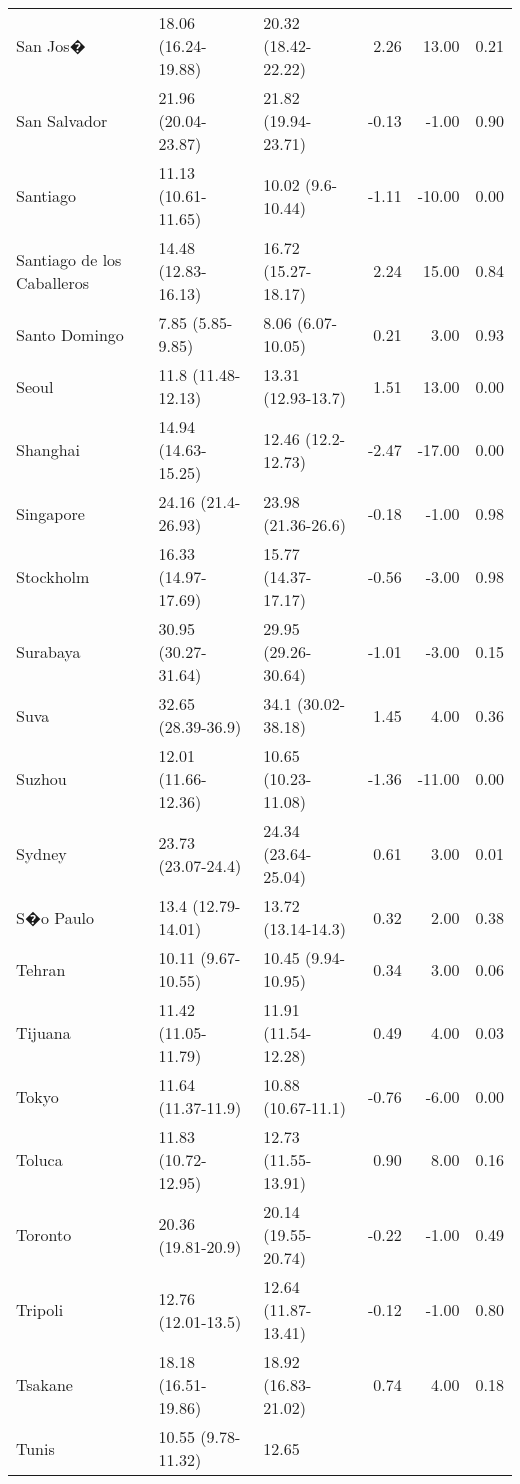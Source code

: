 \begin{longtable}{lllrrr}
  San Jos� & 18.06
 (16.24-19.88) & 20.32
 (18.42-22.22) & 2.26 & 13.00 & 0.21 \\ 
  San Salvador & 21.96
 (20.04-23.87) & 21.82
 (19.94-23.71) & -0.13 & -1.00 & 0.90 \\ 
  Santiago & 11.13
 (10.61-11.65) & 10.02
 (9.6-10.44) & -1.11 & -10.00 & 0.00 \\ 
  Santiago de los Caballeros & 14.48
 (12.83-16.13) & 16.72
 (15.27-18.17) & 2.24 & 15.00 & 0.84 \\ 
  Santo Domingo & 7.85
 (5.85-9.85) & 8.06
 (6.07-10.05) & 0.21 & 3.00 & 0.93 \\ 
  Seoul & 11.8
 (11.48-12.13) & 13.31
 (12.93-13.7) & 1.51 & 13.00 & 0.00 \\ 
  Shanghai & 14.94
 (14.63-15.25) & 12.46
 (12.2-12.73) & -2.47 & -17.00 & 0.00 \\ 
  Singapore & 24.16
 (21.4-26.93) & 23.98
 (21.36-26.6) & -0.18 & -1.00 & 0.98 \\ 
  Stockholm & 16.33
 (14.97-17.69) & 15.77
 (14.37-17.17) & -0.56 & -3.00 & 0.98 \\ 
  Surabaya & 30.95
 (30.27-31.64) & 29.95
 (29.26-30.64) & -1.01 & -3.00 & 0.15 \\ 
  Suva & 32.65
 (28.39-36.9) & 34.1
 (30.02-38.18) & 1.45 & 4.00 & 0.36 \\ 
  Suzhou & 12.01
 (11.66-12.36) & 10.65
 (10.23-11.08) & -1.36 & -11.00 & 0.00 \\ 
  Sydney & 23.73
 (23.07-24.4) & 24.34
 (23.64-25.04) & 0.61 & 3.00 & 0.01 \\ 
  S�o Paulo & 13.4
 (12.79-14.01) & 13.72
 (13.14-14.3) & 0.32 & 2.00 & 0.38 \\ 
  Tehran & 10.11
 (9.67-10.55) & 10.45
 (9.94-10.95) & 0.34 & 3.00 & 0.06 \\ 
  Tijuana & 11.42
 (11.05-11.79) & 11.91
 (11.54-12.28) & 0.49 & 4.00 & 0.03 \\ 
  Tokyo & 11.64
 (11.37-11.9) & 10.88
 (10.67-11.1) & -0.76 & -6.00 & 0.00 \\ 
  Toluca & 11.83
 (10.72-12.95) & 12.73
 (11.55-13.91) & 0.90 & 8.00 & 0.16 \\ 
  Toronto & 20.36
 (19.81-20.9) & 20.14
 (19.55-20.74) & -0.22 & -1.00 & 0.49 \\ 
  Tripoli & 12.76
 (12.01-13.5) & 12.64
 (11.87-13.41) & -0.12 & -1.00 & 0.80 \\ 
  Tsakane & 18.18
 (16.51-19.86) & 18.92
 (16.83-21.02) & 0.74 & 4.00 & 0.18 \\ 
  Tunis & 10.55
 (9.78-11.32) & 12.65

\end{longtable}

